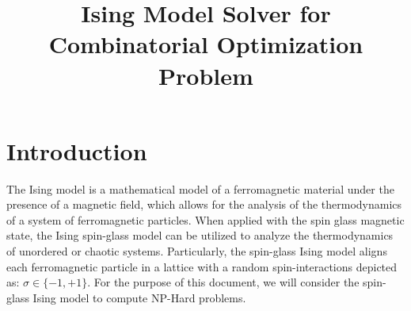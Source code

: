 \documentclass[conference]{IEEEtran}
\begin{document}
\title{Ising Model Solver for Combinatorial Optimization Problem}

\author{
\and
{}
}

\maketitle

\begin{comment}
\begin{abstract}
The integration of quantum computing in finance holds significant promise in showcasing the power of quantum supremacy. By utilizing the quantum approximate optimization algorithm (QAOA), we are able to perform the MaxCut operation on a connected graph of stocks to perform portfolio optimization. In QAOA, a quantum-classical loop consisting of a parameterized quantum circuit and classical optimizer solves a combinatorial problem. This poster shows how we were able to map stock market information to a graph that can undergo the operation of QAOA. Our implementation focuses on using Modern Portfolio Theory (MPT) to evaluate stocks, and aims to separate the portfolio to diversify the portfolio, minimizing risk and maximizing return.

We demonstrate the functionality of our implementation on a weighted 5-complete graph. This graph considers 5 stocks and minimizes the correlation between the two to create a diverse portfolio. We achieved a fidelity of 81\% using 8 repetitions on the simulated environment.
\end{abstract}
\end{comment}

\section{Introduction}
The Ising model is a mathematical model of a ferromagnetic material under the presence of a magnetic field, which allows for the analysis of the thermodynamics of a system of ferromagnetic particles\cite{b1}. When applied with the spin glass magnetic state, the Ising spin-glass model can be utilized to analyze the thermodynamics of unordered or chaotic systems. Particularly, the spin-glass Ising model aligns each ferromagnetic particle in a lattice with a random spin-interactions depicted as: $\sigma \in \{-1, +1\}$. For the purpose of this document, we will consider the spin-glass Ising model to compute NP-Hard problems. %
\end{document}
